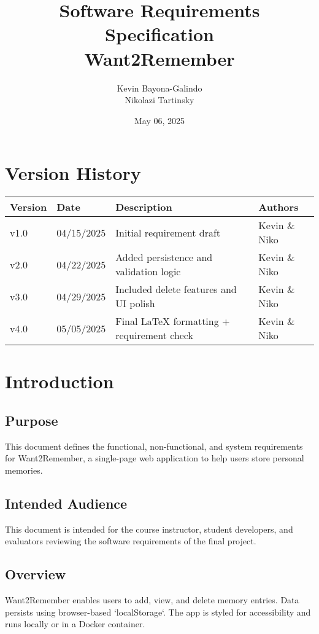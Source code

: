 \documentclass[12pt]{article}
\title{\Huge Software Requirements Specification\\[0.5em]\LARGE Want2Remember}
\author{Kevin Bayona-Galindo \\ Nikolazi Tartinsky}
\date{May 06, 2025}
\begin{document}
\maketitle
\tableofcontents
\newpage

\section*{Version History}
\begin{longtable}{|p{3cm}|p{3cm}|p{6cm}|p{4cm}|}
\hline
\textbf{Version} & \textbf{Date} & \textbf{Description} & \textbf{Authors} \\
\hline
v1.0 & 04/15/2025 & Initial requirement draft & Kevin \& Niko \\
\hline
v2.0 & 04/22/2025 & Added persistence and validation logic & Kevin \& Niko \\
\hline
v3.0 & 04/29/2025 & Included delete features and UI polish & Kevin \& Niko \\
\hline
v4.0 & 05/05/2025 & Final LaTeX formatting + requirement check & Kevin \& Niko \\
\hline
\end{longtable}

\section{Introduction}
\subsection*{Purpose}
This document defines the functional, non-functional, and system requirements for Want2Remember, a single-page web application to help users store personal memories.

\subsection*{Intended Audience}
This document is intended for the course instructor, student developers, and evaluators reviewing the software requirements of the final project.

\subsection*{Overview}
Want2Remember enables users to add, view, and delete memory entries. Data persists using browser-based `localStorage`. The app is styled for accessibility and runs locally or in a Docker container.
\end{document}
